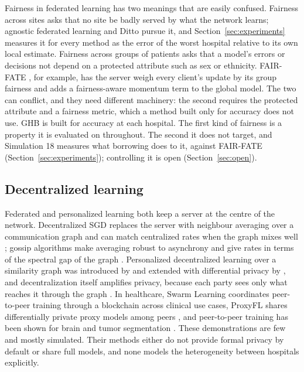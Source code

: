 \documentclass[acmsmall,screen,review]{acmart}
\theoremstyle{acmdefinition}
\begin{document}
Fairness in federated learning has two meanings that are easily confused. Fairness across sites asks that no site be badly served by what the network learns; agnostic federated learning \cite{mohri2019agnostic} and Ditto \cite{li2021ditto} pursue it, and Section~\ref{sec:experiments} measures it for every method as the error of the worst hospital relative to its own local estimate. Fairness across groups of patients asks that a model's errors or decisions not depend on a protected attribute such as sex or ethnicity. FAIR-FATE \cite{salazar2023fairfate}, for example, has the server weigh every client's update by its group fairness and adds a fairness-aware momentum term to the global model. The two can conflict, and they need different machinery: the second requires the protected attribute and a fairness metric, which a method built only for accuracy does not use. GHB is built for accuracy at each hospital. The first kind of fairness is a property it is evaluated on throughout. The second it does not target, and Simulation 18 measures what borrowing does to it, against FAIR-FATE \cite{salazar2023fairfate} (Section~\ref{sec:experiments}); controlling it is open (Section~\ref{sec:open}).

\subsection{Decentralized learning}\label{sec:decentralized}

Federated and personalized learning both keep a server at the centre of the network. Decentralized SGD replaces the server with neighbour averaging over a communication graph and can match centralized rates when the graph mixes well \cite{koloskova2020unified,lian2017can,nedic2009distributed}; gossip algorithms make averaging robust to asynchrony and give rates in terms of the spectral gap of the graph \cite{boyd2006randomized,xiao2004fast}. Personalized decentralized learning over a similarity graph was introduced by \citet{vanhaesebrouck2017decentralized} and extended with differential privacy by \citet{bellet2018personalized}, and decentralization itself amplifies privacy, because each party sees only what reaches it through the graph \cite{cyffers2022privacy}. In healthcare, Swarm Learning \cite{warnatherresthal2021swarm} coordinates peer-to-peer training through a blockchain across clinical use cases, ProxyFL shares differentially private proxy models among peers \cite{kalra2023decentralized}, and peer-to-peer training has been shown for brain and tumor segmentation \cite{roy2019braintorrent,tedeschini2022decentralized}. These demonstrations are few and mostly simulated. Their methods either do not provide formal privacy by default or share full models, and none models the heterogeneity between hospitals explicitly.
\end{document}
